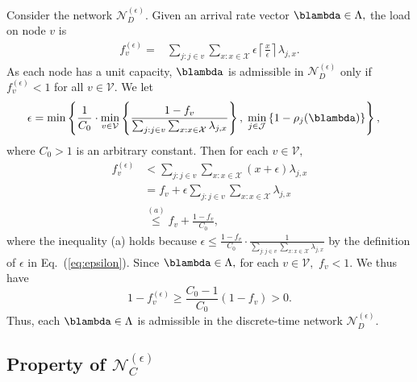 Consider the network $\mathcal{N}_{D}^{(\epsilon)}.$ Given an arrival
rate vector $\blambda\in\Lambda,$ the load on node $v$ is
\begin{align*}
f_{v}^{(\epsilon)}= & \sum_{j:j\in v}\sum_{x:x\in\mathcal{X}}\epsilon\left\lceil \frac{x}{\epsilon}\right\rceil \lambda_{j,x}.
\end{align*}
As each node has a unit capacity, $\blambda$ is admissible in $\mathcal{N}_{D}^{(\epsilon)}$
only if $f_{v}^{(\epsilon)}<1$ for all $v\in\mathcal{V}$. We let 
\begin{align}
\epsilon & = \min \left\{
	\frac{1}{C_{0}}\cdot\min_{v\in\mathcal{V}}\left\{ \frac{1-f_{v}}{\sum_{j:j\in v}\sum_{x:x\in\mathcal{X}}\lambda_{j,x}}\right\},
	\;
	\min_{j\in \mathcal{J}} \left\{ 1- \rho_j(\blambda) \right\} 
\right\},
\label{eq:epsilon}
\end{align}
where $C_{0}>1$ is an arbitrary constant. Then for each $v\in\mathcal{V},$
\begin{align*}
f_{v}^{(\epsilon)} 
& < \sum_{j:j\in v}\sum_{x:x\in\mathcal{X}}(x+\epsilon)\lambda_{j,x} \\
&=  f_{v} + \epsilon \sum_{j:j\in v}\sum_{x:x\in\mathcal{X}} \lambda_{j,x} \\
&\overset{(a)}{\leq}f_{v}+\frac{1-f_{v}}{C_{0}},\label{eq:node_load_Nd}
\end{align*}
where the inequality (a) holds because $\epsilon \le \frac{1-f_{v}}{C_{0}} \cdot \frac{1}{\sum_{j:j\in v}\sum_{x:x\in\mathcal{X}}\lambda_{j,x}} $ by the definition of $\epsilon$
in Eq.\ (\ref{eq:epsilon}). Since $\blambda\in\Lambda,$ for each
$v\in\mathcal{V},$ $f_{v}<1$. We thus have 
\begin{equation}
1-f_{v}^{(\epsilon)}\geq\frac{C_{0}-1}{C_{0}}(1-f_{v})>0.\label{eq:node_load_Nd_gap}
\end{equation}
Thus, each $\blambda\in\Lambda$ is admissible in the discrete-time
network $\mathcal{N}_{D}^{(\epsilon)}$. 

\subsection{Property of $\mathcal{N}_{C}^{(\epsilon)}$\label{subsec:Nc}}

